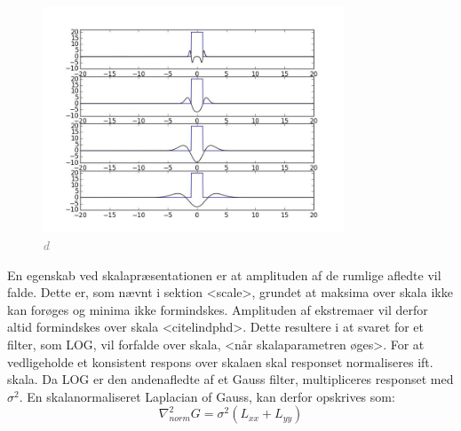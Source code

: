 \begin{figure}[H]
    \centering
    \includegraphics[width=0.80\textwidth]{fig/42.jpg}
    \vspace{-0.5em}
    \begin{center}
    \caption{\textcolor{gray}{\footnotesize \textit{
d   }}}
    \label{fig:laprespons}
     \end{center}
  \end{figure}
       \vspace{-2.7em}
\noindent
En egenskab ved skalapræsentationen er at amplituden af de rumlige afledte vil falde. Dette er, som nævnt i sektion <scale>, grundet
 at maksima over skala ikke kan forøges og minima ikke formindskes. Amplituden af ekstremaer vil derfor altid formindskes over skala <citelindphd>. Dette resultere i at svaret for et filter, som LOG, vil forfalde over skala, <når skalaparametren øges>. For at vedligeholde et konsistent respons over skalaen skal responset normaliseres ift. skala. Da LOG er den andenafledte af et Gauss filter, multipliceres responset med $\sigma^2$. En skalanormaliseret Laplacian of Gauss, kan derfor opskrives som:
$$\nabla^2_{norm}G = \sigma^2(L_{xx}+L_{yy})$$